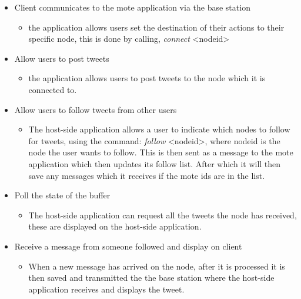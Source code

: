 \documentclass{article}
\begin{document}
\begin{itemize}
	\item Client communicates to the mote application via the base station
	\begin{itemize}
		\item the application allows users set the destination of their actions to their specific node, this is done by calling, \textit{connect} \textless nodeid\textgreater
	\end{itemize}
 	\item Allow users to post tweets
 	\begin{itemize}
 		\item the application allows users to post tweets to the node which it is connected to.
 	\end{itemize}
 	\item Allow users to follow tweets from other users
 	\begin{itemize}
 		\item The host-side application allows a user to indicate which nodes to follow for tweets, using the command: \textit{follow} \textless nodeid\textgreater, where nodeid is the node the user wants to follow. This is then sent as a message to the mote application which then updates its follow list. After which it will then save any messages which it receives if the mote ids are in the list.
 	\end{itemize}
 	\item Poll the state of the buffer
 	\begin{itemize}
 		\item The host-side application can request all the tweets the node has received, these are displayed on the host-side application.
 	\end{itemize}
 	\item Receive a message from someone followed and display on client
 	\begin{itemize}
 		\item When a new message has arrived on the node, after it is processed it is then saved and transmitted the the base station where the host-side application receives and displays the tweet. 
 	\end{itemize}
 \end{itemize} 
\end{document}
